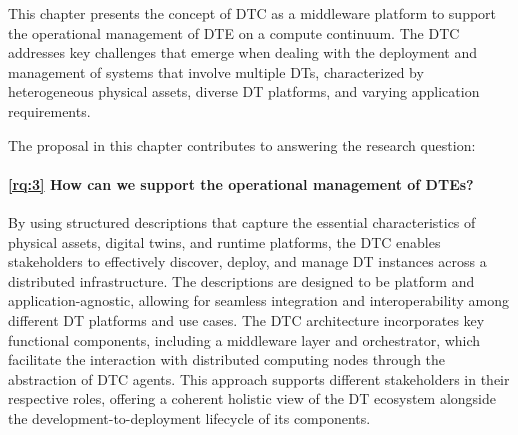 This chapter presents the concept of \acl{DTC} as a middleware platform to support the operational management of \ac{DTE} on a compute continuum. 
%
The \ac{DTC} addresses key challenges that emerge when dealing with the deployment and management of systems that involve multiple \acp{DT}, characterized by heterogeneous physical assets, diverse DT platforms, and varying application requirements.

The proposal in this chapter contributes to answering the research question:

\paragraph{\ref{rq:3} How can we support the operational management of DTEs?}

By using structured descriptions that capture the essential characteristics of physical assets, digital twins, and runtime platforms, the DTC enables stakeholders to effectively discover, deploy, and manage DT instances across a distributed infrastructure.
%
The descriptions are designed to be platform and application-agnostic, allowing for seamless integration and interoperability among different DT platforms and use cases.
%
The DTC architecture incorporates key functional components, including a middleware layer and orchestrator, which facilitate the interaction with distributed computing nodes through the abstraction of DTC agents. 
%
This approach supports different stakeholders in their respective roles, offering a coherent holistic view of the DT ecosystem alongside the development-to-deployment lifecycle of its components. 

